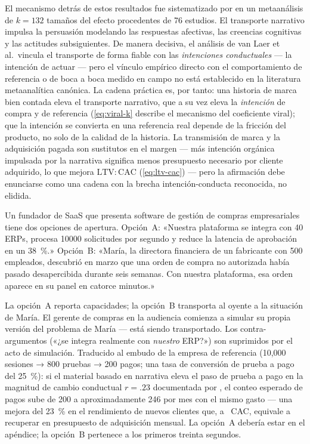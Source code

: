 El mecanismo detrás de estos resultados fue sistematizado por \textcite{vanlaer2014extended}
en un metaanálisis de \(k = 132\) tamaños del efecto procedentes de 76 estudios. El transporte
narrativo impulsa la persuasión modelando las respuestas afectivas, las creencias cognitivas
y las actitudes subsiguientes. De manera decisiva, el análisis de van Laer et al.\ vincula el
transporte de forma fiable con las \emph{intenciones conductuales} — la intención de actuar —
pero el vínculo empírico directo con el comportamiento de referencia o de boca a boca medido
en campo no está establecido en la literatura metaanalítica canónica. %
La cadena práctica es, por tanto: una historia de marca bien contada eleva el transporte narrativo,
que a su vez eleva la \emph{intención} de compra y de referencia (\cref{eq:viral-k} describe
el mecanismo del coeficiente viral); que la intención se convierta en una referencia real
depende de la fricción del producto, no solo de la calidad de la historia. La transmisión de
marca y la adquisición pagada son sustitutos en el margen — más intención orgánica impulsada
por la narrativa significa menos presupuesto necesario por cliente adquirido, lo que mejora
\(\mathrm{LTV:CAC}\) (\cref{eq:ltv-cac}) — pero la afirmación debe enunciarse como una cadena
con la brecha intención-conducta reconocida, no elidida.

\begin{example}
Un fundador de SaaS que presenta software de gestión de compras empresariales tiene dos
opciones de apertura. Opción~A: «Nuestra plataforma se integra con 40 ERPs, procesa
\num{10000} solicitudes por segundo y reduce la latencia de aprobación en un \qty{38}{\percent}.»
Opción~B: «María, la directora financiera de un fabricante con \num{500} empleados, descubrió
en marzo que una orden de compra no autorizada había pasado desapercibida durante seis semanas.
Con nuestra plataforma, esa orden aparece en su panel en catorce minutos.»

La opción~A reporta capacidades; la opción~B transporta al oyente a la situación de María. El
gerente de compras en la audiencia comienza a simular su propia versión del problema de María
— está siendo transportado. Los contra-argumentos («¿se integra realmente con \emph{nuestro}
ERP?») son suprimidos por el acto de simulación. Traducido al embudo de la empresa de referencia
(10,000 sesiones → 800 pruebas → 200 pagos; una tasa de conversión de prueba a pago del
\qty{25}{\percent}): si el material basado en narrativa eleva el paso de prueba a pago en la
magnitud de cambio conductual \(r = .23\) documentada por \textcite{braddock2016narrative},
el conteo esperado de pagos sube de 200 a aproximadamente 246 por mes con el mismo gasto —
una mejora del \qty{23}{\percent} en el rendimiento de nuevos clientes que, a ~CAC,
equivale a recuperar  en presupuesto de adquisición mensual. La opción~A debería
estar en el apéndice; la opción~B pertenece a los primeros treinta segundos.
\end{example}

